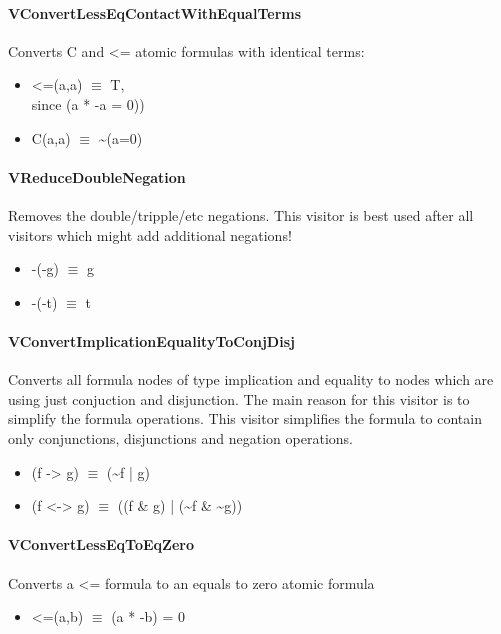 \documentclass{article}
\begin{document}
	\paragraph{VConvertLessEqContactWithEqualTerms}
				Converts C and <= atomic formulas with identical terms:
				\begin{itemize}
					\item <=(a,a) $\equiv$ T, \\
						since (a * -a = 0))
					\item C(a,a) $\equiv$ \textasciitilde(a=0)
				\end{itemize}

	\paragraph{VReduceDoubleNegation}
				Removes the double/tripple/etc negations.
				This visitor is best used after all visitors which might add additional negations!
				\begin{itemize}
					\item -(-g) $\equiv$ g
					\item -(-t) $\equiv$ t
				\end{itemize}

	\paragraph{VConvertImplicationEqualityToConjDisj}
				Converts all formula nodes of type implication and equality to nodes
				which are using just conjuction and disjunction. The main reason for this visitor is to simplify the formula operations.
				This visitor simplifies the formula to contain only conjunctions, disjunctions and negation operations.
				\begin{itemize}
					\item (f -> g)  $\equiv$ (\textasciitilde f | g)
					\item (f <-> g) $\equiv$ ((f \& g) | (\textasciitilde f \& \textasciitilde g))
				\end{itemize}

	\paragraph{VConvertLessEqToEqZero}
				Converts a <= formula to an equals to zero atomic formula
				\begin{itemize}
					\item <=(a,b) $\equiv$ (a * -b) = 0
				\end{itemize}
\end{document}

